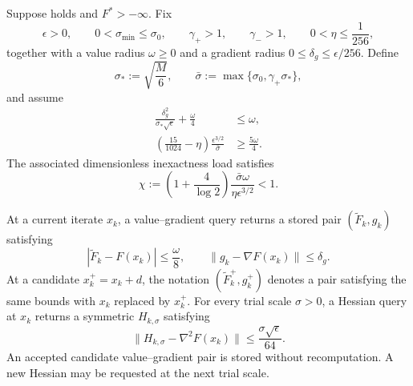 \documentclass{article}
\begin{document}
\begin{assumption}
\label{ass:adaptive-inexact-oracle}
Suppose  holds and $F^*>-\infty$.  Fix
\[
 \epsilon>0,\qquad
 0<\sigma_{\min}\le\sigma_0,\qquad
 \gamma_+>1,\qquad \gamma_->1,\qquad
 0<\eta\le\frac1{256},
\]
together with a value radius $\omega\ge0$ and a gradient radius
$0\le\delta_g\le\epsilon/256$.  Define
\begin{equation}\label{eq:adaptive-scale-bar}
 \sigma_*:=\sqrt{\frac M6},
 \qquad
 \bar\sigma:=\max\{\sigma_0,\gamma_+\sigma_*\},
\end{equation}
and assume
\begin{subequations}\label{eq:adaptive-safe-compatibility}
\begin{align}
 \frac{\delta_g^2}{\sigma_*\sqrt\epsilon}+\frac\omega4
 &\le\omega,
 \label{eq:adaptive-interior-compatibility}\\
 \left(\frac{15}{1024}-\eta\right)
 \frac{\epsilon^{3/2}}{\bar\sigma}
 &\ge\frac{5\omega}{4}.
 \label{eq:adaptive-boundary-compatibility}
\end{align}
\end{subequations}
The associated dimensionless inexactness load satisfies
\begin{equation}\label{eq:adaptive-absorption-load}
 \chi:=\left(1+\frac4{\log2}\right)
       \frac{\bar\sigma\omega}{\eta\epsilon^{3/2}}<1.
\end{equation}

At a current iterate $x_k$, a value--gradient query returns a stored
pair $(\widetilde F_k,g_k)$ satisfying
\begin{equation}\label{eq:adaptive-vg-errors}
 |\widetilde F_k-F(x_k)|\le\frac\omega8,
 \qquad
 \|g_k-\nabla F(x_k)\|\le\delta_g.
\end{equation}
At a candidate $x_k^+=x_k+d$, the notation
$(\widetilde F_k^+,g_k^+)$ denotes a pair satisfying the same bounds
with $x_k$ replaced by $x_k^+$.  For every trial scale $\sigma>0$, a
Hessian query at $x_k$ returns a symmetric $H_{k,\sigma}$ satisfying
\begin{equation}\label{eq:adaptive-hessian-error}
 \|H_{k,\sigma}-\nabla^2F(x_k)\|
 \le\frac{\sigma\sqrt\epsilon}{64}.
\end{equation}
An accepted candidate value--gradient pair is stored without
recomputation.  A new Hessian may be requested at the next trial
scale.
\end{assumption}
\end{document}
